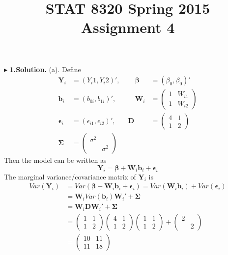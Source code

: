 \documentclass[letterpaper, 12pt]{article}
\newcommand{\ba}{$$\begin{aligned}}
\newcommand{\ea}{\end{aligned}$$}
\begin{document}
\title{STAT 8320 Spring 2015 Assignment 4}
\author{}
\maketitle
\indent




$\blacktriangleright$ \textbf{1.\quad Solution.} 
(a). Define
\ba
\bm{Y}_i&=(Y_i1,Y_i2)',&\quad\bm{\beta}&=(\beta_0,\beta_0)'\\
\bm{b}_i&=(b_{0i},b_{1i})', &\quad\bm{W}_i&=\left(\begin{matrix}
1&W_{i1}\\
1&W_{i2}
\end{matrix}\right)\\
\bm{\epsilon}_i&=(\epsilon_{i1},\epsilon_{i2})',\quad&\bm{D}&=\left(\begin{matrix}
4 &1\\
1 &2
\end{matrix}\right)\\
\bm{\Sigma}&=\left(\begin{matrix}
\sigma^2\\
&\sigma^2
\end{matrix}\right)
\ea
Then the model can be written as
$$
\bm{Y}_i=\bm{\beta}+\bm{W}_i\bm{b}_i+\bm{\epsilon}_i
$$
The marginal variance/covariance matrix of $\bm{Y}_i$ is 
\ba
Var(\bm{Y}_i)&=Var(\bm{\beta}+\bm{W}_i\bm{b}_i+\bm{\epsilon}_i)=Var(\bm{W}_i\bm{b}_i)+Var(\bm{\epsilon}_i)\\
&=\bm{W}_iVar(\bm{b}_i)\bm{W}_i'+\bm{\Sigma}\\
&=\bm{W}_i\bm{D}\bm{W}_i'+\bm{\Sigma}\\
&=\left(\begin{matrix}
1&1\\
1&2
\end{matrix}\right)\left(\begin{matrix}
4&1\\
1&2
\end{matrix}\right)\left(\begin{matrix}
1&1\\
1&2
\end{matrix}\right)+\left(\begin{matrix}
2\\
&2
\end{matrix}\right)\\
&=\left(\begin{matrix}
10&11\\
11&18
\end{matrix}\right)
\ea
\end{document}
